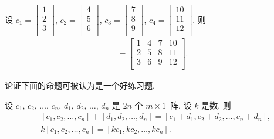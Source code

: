 \documentclass[%
    UTF8,%
    fontset=none,%
    punct=kaiming,%
    zihao=-4,%
    a4paper,%
    oneside,%
]{ctexbook}
\begin{document}
\begin{example}
    设
    \(c_1 =  \begin{bmatrix}
        1 \\2\\3\\
    \end{bmatrix}\),
    \(c_2 =  \begin{bmatrix}
        4 \\5\\6\\
    \end{bmatrix}\),
    \(c_3 =  \begin{bmatrix}
        7 \\8\\9\\
    \end{bmatrix}\),
    \(c_4 =  \begin{bmatrix}
        10 \\11\\12\\
    \end{bmatrix}\).
    则
    \begin{align*}
        [c_1, c_2, c_3, c_4]
        =
        \begin{bmatrix}
            1 & 4 & 7 & 10 \\
            2 & 5 & 8 & 11 \\
            3 & 6 & 9 & 12 \\
        \end{bmatrix}.
    \end{align*}
\end{example}

论证下面的命题可被认为是一个好练习题.

\begin{theorem}
    设
    \(c_1\), \(c_2\), \(\dots\), \(c_n\),
    \(d_1\), \(d_2\), \(\dots\), \(d_n\)
    是 \(2n\) 个 \(m \times 1\)~阵.
    设 \(k\) 是数.
    则
    \begin{align*}
         & [c_1, c_2, \dots, c_n] + [d_1, d_2, \dots, d_n]
        = [c_1 + d_1, c_2 + d_2, \dots, c_n + d_n],        \\
         & k[c_1, c_2, \dots, c_n]
        = [kc_1, kc_2, \dots, kc_n].
    \end{align*}
\end{theorem}
\end{document}
